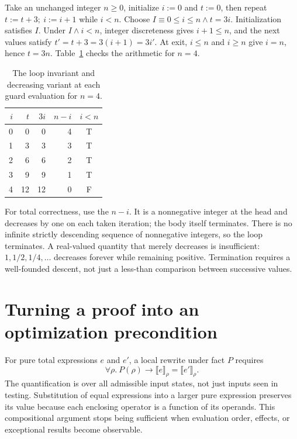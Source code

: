 Take an unchanged integer $n\geq0$, initialize $i:=0$ and $t:=0$, then repeat $t:=t+3;\ i:=i+1$ while $i<n$.
Choose $I\equiv 0\leq i\leq n\land t=3i$.
Initialization satisfies $I$.
Under $I\land i<n$, integer discreteness gives $i+1\leq n$, and the next values satisfy $t'=t+3=3(i+1)=3i'$.
At exit, $i\leq n$ and $i\geq n$ give $i=n$, hence $t=3n$.
Table~\ref{tab:ch40-loop-trace} checks the arithmetic for $n=4$.

\begin{table}
\caption{The loop invariant and decreasing variant at each guard evaluation for $n=4$.}
\label{tab:ch40-loop-trace}
\centering
\begin{tabular}{rrrrc}
\toprule
$i$ & $t$ & $3i$ & $n-i$ & $i<n$ \\
\midrule
0 & 0 & 0 & 4 & T \\
1 & 3 & 3 & 3 & T \\
2 & 6 & 6 & 2 & T \\
3 & 9 & 9 & 1 & T \\
4 & 12 & 12 & 0 & F \\
\bottomrule
\end{tabular}
\end{table}

For total correctness, use the  $n-i$.
It is a nonnegative integer at the head and decreases by one on each taken iteration; the body itself terminates.
There is no infinite strictly descending sequence of nonnegative integers, so the loop terminates.
A real-valued quantity that merely decreases is insufficient: $1,1/2,1/4,\ldots$ decreases forever while remaining positive.
Termination requires a well-founded descent, not just a less-than comparison between successive values.

\section{Turning a proof into an optimization precondition}
\label{sec:ch40-optimization}

For pure total expressions $e$ and $e'$, a local rewrite under fact $P$ requires
\[
  \forall\rho.\ P(\rho)\rightarrow
  \llbracket e\rrbracket_\rho=\llbracket e'\rrbracket_\rho.
\]
The quantification is over all admissible input states, not just inputs seen in testing.
Substitution of equal expressions into a larger pure expression preserves its value because each enclosing operator is a function of its operands.
This compositional argument stops being sufficient when evaluation order, effects, or exceptional results become observable.

